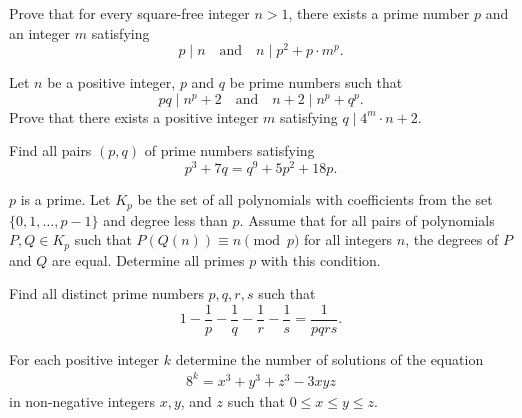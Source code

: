\documentclass[problems.tex]{subfile}
\begin{document}
	\begin{problem}
		Prove that for every square-free integer $n>1$, there exists a prime number $p$ and an integer $m$ satisfying
		\[ p \mid n \quad \text{and} \quad n \mid p^2+p\cdot m^p. \]
	\end{problem}
	
	
	
	\begin{problem}
		Let $n$ be a positive integer, $p$ and $q$ be prime numbers such that
		\[ pq \mid n^p+2 \quad \text{and} \quad n+2 \mid n^p+q^p. \] Prove that there exists a positive integer $m$ satisfying $q \mid 4^m \cdot n +2$. %
	\end{problem}
	
	
	
	\begin{problem}
		Find all pairs $(p, q)$ of prime numbers satisfying
		\[ p^3+7q=q^9+5p^2+18p. \]
	\end{problem}
	
	
	
	\begin{problem}
		$p$ is a prime. Let $K_p$ be the set of all polynomials with coefficients from the set $\{0,1,\dots ,p-1\}$ and degree less than $p$. Assume that for all pairs of polynomials $P,Q\in K_p$ such that $P(Q(n))\equiv n\pmod p$ for all integers $n$, the degrees of $P$ and $Q$ are equal. Determine all primes $p$ with this condition. %
	\end{problem}
	
	
	
	
	\begin{problem}
		Find all distinct prime numbers $p,q,r,s$ such that $$1-\frac{1}{p} - \frac{1}{q} -\frac{1}{r} - \frac{1}{s} =\frac{1}{pqrs}.$$
	\end{problem}
	
	
	
	
	\begin{problem}
		For each positive integer $k$ determine the number of solutions of the equation
		\begin{align*}
			8^k = x^3 + y^3 + z^3 - 3xyz
		\end{align*}
		in non-negative integers $x,y$, and $z$ such that $0 \leq x \leq y \leq z$.
	\end{problem}
	
\end{document}
